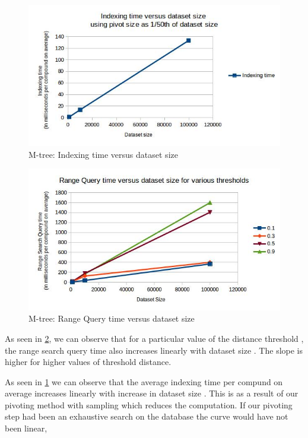 \begin{figure}[ht!]	
\centering
\includegraphics[width=1 \columnwidth]{img/image6.jpg}
\caption{M-tree: Indexing time versus dataset size}
\label{fig:5.8}
\end{figure}

\begin{figure}[ht!]	
\centering
\includegraphics[width=1 \columnwidth]{img/image9.jpg}
\caption{M-tree: Range Query time versus dataset size}
\label{fig:5.9}
\end{figure}


As seen in \ref{fig:5.9}, we can observe that for a particular value of the distance threshold , the range search query time also increases linearly with dataset size . The slope is higher for higher values of threshold distance.

As seen in \ref{fig:5.8} we can observe that the average indexing time per compund on average increases linearly with increase in dataset size . This is as a result of our pivoting method with sampling which reduces the computation. If our pivoting step had been an exhaustive search on the database the curve would have not been linear, 





